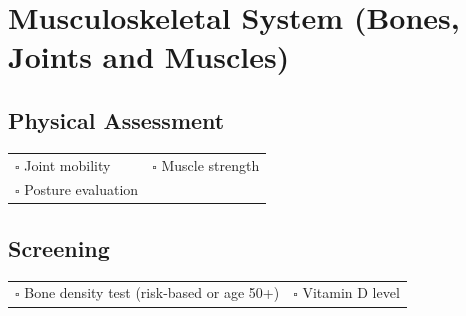 
\section{Musculoskeletal System (Bones, Joints and Muscles)}
\label{sec:musculoskeletal}

\subsection{Physical Assessment}

\begin{tabular}{p{9cm} p{8cm}}
$\square$ Joint mobility & $\square$ Muscle strength \\ 
$\square$ Posture evaluation & \\ 
\end{tabular}

\subsection{Screening}

\begin{tabular}{p{9cm} p{8cm}}
$\square$ Bone density test (risk-based or age 50+) & $\square$ Vitamin D level \\ 
\end{tabular}

